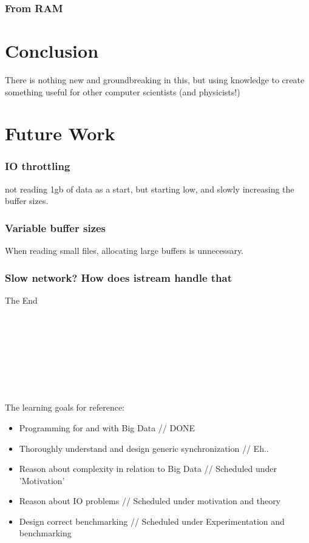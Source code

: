 \documentclass[a4paper]{article}
\begin{document}
\subsubsection{From RAM}





\newpage
\section{Conclusion}
There is nothing new and groundbreaking in this, but using knowledge to create something useful for other computer scientists (and physicists!)



\section{Future Work}
\subsubsection{IO throttling}
not reading 1gb of data as a start, but starting low, and slowly increasing the buffer sizes.

\subsubsection{Variable buffer sizes}
When reading small files, allocating large buffers is unnecessary.

\subsubsection{Slow network? How does istream handle that}





The End \\\\\\\\\\\\\\\\\\

The learning goals for reference:

\begin{itemize}
  \item Programming for and with Big Data  // DONE
  \item Thoroughly understand and design generic synchronization  // Eh..
  \item Reason about complexity in relation to Big Data // Scheduled under 'Motivation'
  \item Reason about IO problems  // Scheduled under motivation and theory
  \item Design correct benchmarking  // Scheduled under Experimentation and benchmarking
\end{itemize}
\end{document}
